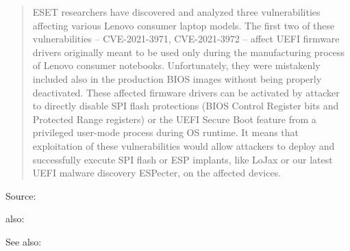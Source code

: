 \documentclass[Screen16to9,17pt]{foils}
\begin{document}
\begin{quote}
ESET researchers have discovered and analyzed three vulnerabilities affecting various Lenovo consumer laptop models. The first two of these vulnerabilities – CVE-2021-3971, CVE-2021-3972 – affect UEFI firmware drivers originally meant to be used only during the manufacturing process of Lenovo consumer notebooks. Unfortunately, they were mistakenly included also in the production BIOS images without being properly deactivated. These affected firmware drivers can be activated by attacker to directly disable SPI flash protections (BIOS Control Register bits and Protected Range registers) or the UEFI Secure Boot feature from a privileged user-mode process during OS runtime. It means that exploitation of these vulnerabilities would allow attackers to deploy and successfully execute SPI flash or ESP implants, like LoJax or our latest UEFI malware discovery ESPecter, on the affected devices.
\end{quote}

Source:

also:

See also:
\end{document}

